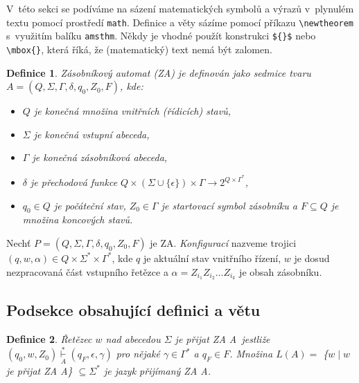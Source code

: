 \documentclass[11pt, a4paper, twocolumn]{article}
\newtheorem{definition}{Definice}
\begin{document}
V~této sekci se podíváme na sázení matematických symbolů a výrazů v~plynulém textu 
pomocí prostředí \texttt{math}. Definice a věty sázíme pomocí příkazu \verb|\newtheorem|
s~využitím balíku \texttt{amsthm}. Někdy je vhodné použít konstrukci \verb|${}$|
nebo \verb|\mbox{}|, která říká, že (matematický) text nemá být zalomen.

\begin{definition}\label{def1}
\textup{Zásobníkový automat} (ZA) je definován jako sedmice tvaru 
$A = (Q, \Sigma, \Gamma, \delta, q_0, Z_0, F ) $, kde:

\begin{itemize}
    \item
        $Q$ je konečná množina \textup{vnitřních (řídicích) stavů,} 
    \item
        $\Sigma$ je konečná \textup{vstupní abeceda,}
    \item
        $\Gamma$ je konečná \textup{zásobníková abeceda,}
    \item
        $\delta$ je \textup{přechodová funkce}
        $Q \times (\Sigma \cup \{\epsilon\}) \times \Gamma \rightarrow 2^{Q\times\Gamma^\ast}$,
    \item
        $q_0 \in Q$ je \textup{počáteční stav}, $Z_0 \in \Gamma$ 
        \textup{je startovací symbol zásobníku} a $F \subseteq Q$ je množina \textup{koncových stavů.}

\end{itemize}
\end{definition}

Nechť $P = (Q, \Sigma, \Gamma, \delta, q_0, Z_0, F )$ je ZA.
\textit{Konfigurací} nazveme trojici $(q, w, \alpha) \in Q \times \Sigma^\ast \times \Gamma^\ast$, kde $q$ je aktuální stav vnitřního řízení, $w$ je dosud nezpracovaná část vstupního
řetězce a $\alpha = Z_{i_1}Z_{i_2} \dots Z_{i_k}$ je obsah zásobníku.

\subsection{Podsekce obsahující definici a větu}

\begin{definition}\label{def2}
\textup{Řetězec} $w$ \textup{nad abecedou} $\Sigma$ \textup{je přijat ZA} A~jestliže 
$(q_0, w, Z_0) \underset{A}{\overset{*}{\vdash}} (q_F, \epsilon, \gamma)$
pro nějaké $\gamma \in \Gamma^\ast$ a $q_F \in F$. 
Množina $L(A) =$ \{$w\; |\; w$ je přijat ZA A\} $\subseteq \Sigma^\ast $ je
\textup{jazyk přijímaný ZA} A.
\end{definition}
\end{document}
